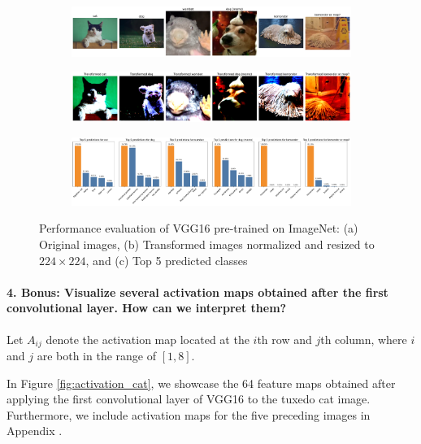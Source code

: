 \begin{figure}[H]
    \centering
    \begin{subfigure}{0.95\textwidth}
        \includegraphics[width=\textwidth]{original_images}
        \caption{}
        \label{subfig:original_images}
    \end{subfigure}
    \begin{subfigure}{0.95\textwidth}
        \includegraphics[width=\textwidth]{transformed_images}
        \caption{}
        \label{subfig:transformed_images}
    \end{subfigure}
    \begin{subfigure}{0.95\textwidth}
        \includegraphics[width=\textwidth]{prediction_plots}
        \caption{}
        \label{subfig:prediction_plots}
    \end{subfigure}
    \caption{Performance evaluation of VGG16 pre-trained on ImageNet: (a) Original images, (b) Transformed images normalized and resized to $224 \times 224$, and (c) Top 5 predicted classes}
    \label{fig:vgg16}
\end{figure}


\paragraph{4. \textbf{Bonus}: Visualize several activation maps obtained after the first convolutional layer. How can we interpret them?}
Let $A_{ij}$ denote the activation map located at the $i$th row and $j$th column, where $i$ and $j$ are both in the range of $[1, 8]$.

In Figure \ref{fig:activation_cat}, we showcase the 64 feature maps obtained after applying the first convolutional layer of VGG16 to the tuxedo cat image. Furthermore, we include activation maps for the five preceding images in Appendix .

